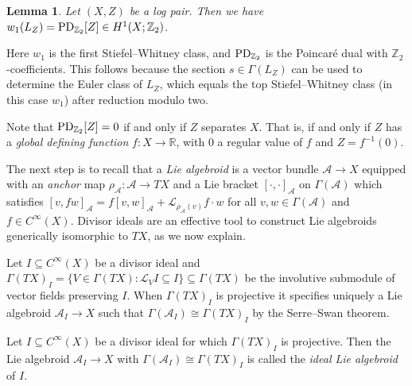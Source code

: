 \documentclass[10pt,a4paper]{amsart}
\numberwithin{equation}{section}
\newtheorem{Lemma}[Theorem]{Lemma}
\begin{document}
\begin{Lemma}\label{lem:logdivisor} Let $(X,Z)$ be a log pair. Then we have $w_1(L_Z) = {\rm PD}_{\mathbb{Z}_2}[Z] \in H^1(X;\mathbb{Z}_2)$.
\end{Lemma}

Here $w_1$ is the first Stiefel--Whitney class, and ${\rm PD}_{\mathbb{Z}_2}$ is the Poincar\'e dual with $\mathbb{Z}_2$-coefficients. This follows because the section $s \in \Gamma(L_Z)$ can be used to determine the Euler class of $L_Z$, which equals the top Stiefel--Whitney class (in this case $w_1$) after reduction modulo two.

\begin{Remark}\label{rem:separating} Note that ${\rm PD}_{\mathbb{Z}_2}[Z] = 0$ if and only if $Z$ separates $X$. That is, if and only if $Z$ has a \emph{global defining function} $f\colon X \to \mathbb{R}$, with $0$ a regular value of $f$ and $Z = f^{-1}(0)$.
\end{Remark}

The next step is to recall that a \emph{Lie algebroid} is a vector bundle $\mathcal{A} \to X$ equipped with an \emph{anchor} map $\rho_{\mathcal{A}}\colon \mathcal{A} \to TX$ and a Lie bracket $[\cdot,\cdot]_\mathcal{A}$ on $\Gamma(\mathcal{A})$ which satisfies $[v, f w]_\mathcal{A} = f [v,w]_\mathcal{A} + \mathcal{L}_{\rho_{\mathcal{A}}(v)} f \cdot w$ for all $v, w \in \Gamma(\mathcal{A})$ and $f \in C^\infty(X)$. Divisor ideals are an effective tool to construct Lie algebroids generically isomorphic to $TX$, as we now explain.

Let $I \subseteq C^\infty(X)$ be a divisor ideal and $\Gamma(TX)_I = \{V \in \Gamma(TX)\colon \mathcal{L}_V I \subseteq I\} \subseteq \Gamma(TX)$ be the involutive submodule of vector fields preserving $I$. When $\Gamma(TX)_I$ is projective it specifies uniquely a Lie algebroid $\mathcal{A}_I \to X$ such that $\Gamma(\mathcal{A}_I) \cong \Gamma(TX)_I$ by the Serre--Swan theorem.

\begin{Definition} Let $I \subseteq C^\infty(X)$ be a divisor ideal for which $\Gamma(TX)_I$ is projective. Then the Lie algebroid $\mathcal{A}_I \to X$ with $\Gamma(\mathcal{A}_I) \cong \Gamma(TX)_I$ is called the \emph{ideal Lie algebroid} of $I$.
\end{Definition}
\end{document}
